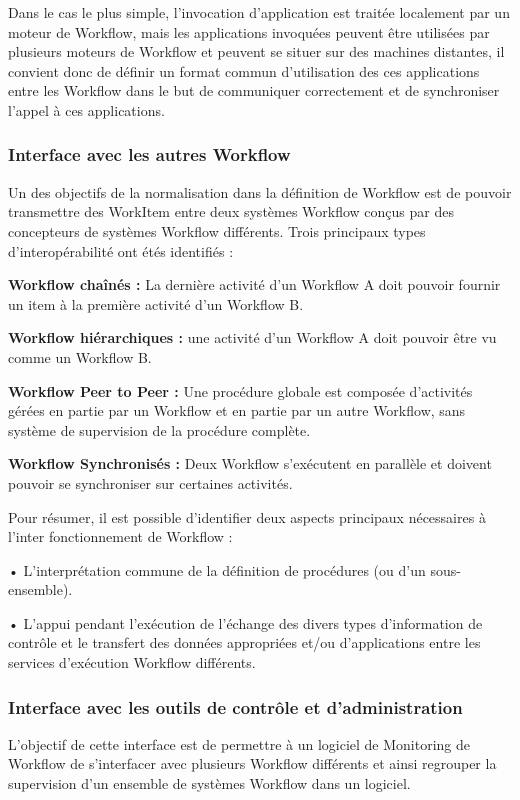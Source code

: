 Dans le cas le plus simple, l'invocation d'application est traitée localement par un moteur
de Workflow, mais les applications invoquées peuvent être utilisées par plusieurs moteurs de
Workflow et peuvent se situer sur des machines distantes, il convient donc de définir un format commun d’utilisation des ces applications entre les Workflow dans le but de communiquer correctement et de synchroniser l’appel à ces applications. 

\subsubsection{Interface avec les autres Workflow }
Un des objectifs de la normalisation dans la définition de Workflow est de pouvoir
transmettre des WorkItem entre deux systèmes Workflow conçus par des concepteurs de systèmes Workflow différents. Trois principaux types d’interopérabilité ont étés identifiés : 

\textbf{Workflow chaînés :} La dernière activité d’un Workflow A doit pouvoir fournir un item à la première activité d’un Workflow B.

\textbf{ Workflow hiérarchiques :} une activité d’un Workflow A doit pouvoir être vu comme un
Workflow B. 

\textbf{Workflow Peer to Peer :} Une procédure globale est composée d’activités gérées en partie par un Workflow et en partie par un autre Workflow, sans système de supervision de
la procédure complète. 

\textbf{Workflow Synchronisés :} Deux Workflow s’exécutent en parallèle et doivent pouvoir se
synchroniser sur certaines activités. 

Pour résumer, il est possible d’identifier deux aspects principaux nécessaires à
l’inter fonctionnement de Workflow :

• L’interprétation commune de la définition de procédures (ou d’un sous-ensemble).

• L’appui pendant l'exécution de l’échange des divers types d'information de contrôle et
le transfert des données appropriées et/ou d'applications entre les services d’exécution Workflow différents.

\subsubsection{Interface avec les outils de contrôle et d’administration }


L’objectif de cette interface est de permettre à un logiciel de Monitoring de Workflow de
s’interfacer avec plusieurs Workflow différents et ainsi regrouper la supervision d’un ensemble de systèmes Workflow dans un logiciel.


